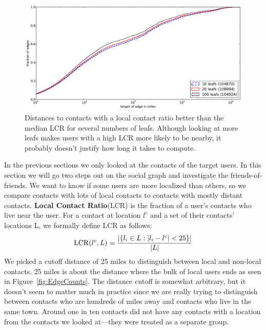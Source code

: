 \begin{figure}[tbh]
\centering
\includegraphics[width=\linewidth]{figures/locals_cmp.pdf}
\caption{
    Distances to contacts with a local contact ratio better than the median LCR
    for several numbers of leafs.
    Although looking at more leafs makes users with a high LCR more likely to
    be nearby, it probably doesn't justify how long it takes to compute.
}
\label{fig:LocalCmp}
\end{figure}

\label{sec:closer}

In the previous sections we only looked at the contacts of the target
users.
%
In this section we will go two steps out on the social graph and
investigate the friends-of-friends.
%
We want to know if some users are more localized than others, so we compare
contacts with lots of local contacts to contacts with mostly distant contacts.
%
\textbf{Local Contact Ratio}(LCR) is the fraction of a user's contacts
who live near the user.
%
For a contact at location $l^c$ and a set of their contacts' locations L, we
formally define LCR as follows:
\[
    \operatorname{LCR}(l^c,L) = { |\{ l_i \in L : |l_i-l^c|<25 \}|
                    \over |L| }
\]
%
We picked a cutoff distance of 25 miles to distinguish between local and non-local
contacts.
25 miles is about the distance where the bulk of local users ends as seen in
Figure~\ref{fig:EdgeCounts}.
%
The distance cutoff is somewhat arbitrary, but it doesn't seem to matter much
in practice since we are really trying to distinguish between contacts who are
hundreds of miles away and contacts who live in the same town.
%
Around one in ten contacts did not have any contacts with a location from the
contacts we looked at---they were treated as a separate group.

